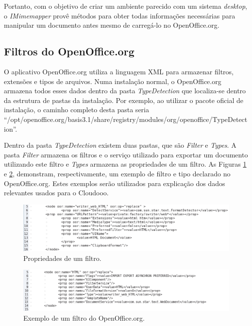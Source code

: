 Portanto, com o objetivo de criar um ambiente parecido com um sistema \textit{desktop}, o \textit{IMimemapper} provê métodos para obter todas informações necessárias para manipular um documento antes mesmo de carregá-lo no OpenOffice.org.

\subsection{Filtros do OpenOffice.org}
O aplicativo OpenOffice.org utiliza a linguagem XML para armazenar filtros, extensões e tipos de arquivos. Numa instalação normal, o OpenOffice.org armazena todos esses dados dentro da pasta \textit{TypeDetection} que localiza-se dentro da estrutura de pastas da instalação. Por exemplo, ao utilizar o pacote oficial de instalação, o caminho completo desta pasta seria ``/opt/openoffice.org/basis3.1/share/registry/modules/org/openoffice/TypeDetection''.

Dentro da pasta \textit{TypeDetection} existem duas pastas, que são \textit{Filter} e \textit{Types}. A pasta \textit{Filter} armazena os filtros e o serviço utilizado para exportar um documento utilizando este filtro e \textit{Types} armazena as propriedades de um filtro. As Figuras \ref{fig:type1} e \ref{fig:filter}, demonstram, respectivamente, um exemplo de filtro e tipo declarado no OpenOffice.org. Estes exemplos serão utilizados para explicação dos dados relevantes usados para o Cloudooo.

\begin{figure}[!ht]
\centering
\begin{center}
\includegraphics[scale=0.610,bb=0 0 750 166]{type1.jpg}
\end{center}
\caption{Propriedades de um filtro.}
\label{fig:type1}
\end{figure}

\begin{figure}[!ht]
\centering
\begin{center}
\includegraphics[scale=0.610,bb=0 0 750 146]{filter.jpg}
\end{center}
\caption{Exemplo de um filtro do OpenOffice.org.}
\label{fig:filter}
\end{figure}

